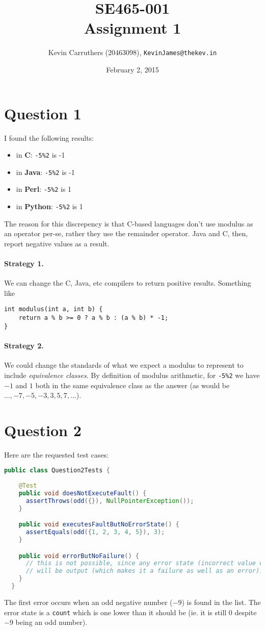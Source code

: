 \documentclass[12pt]{article}
\title{SE465-001\\Assignment 1}
\author{Kevin Carruthers (20463098), {\tt KevinJames@thekev.in}}
\date{February 2, 2015}
\begin{document}
\maketitle

\section*{Question 1}
I found the following results:
\begin{itemize}
\item in {\bf C}: \verb+-5%2+ is -1
\item in {\bf Java}: \verb+-5%2+ is -1
\item in {\bf Perl}: \verb+-5%2+ is 1
\item in {\bf Python}: \verb+-5%2+ is 1
\end{itemize}

The reason for this discrepency is that C-based languages don't use modulus as an operator per-se, rather they use the remainder operator. Java and C, then, report negative values as a result.

\paragraph{Strategy 1.}
We can change the C, Java, etc compilers to return positive results. Something like
\begin{verbatim}
int modulus(int a, int b) {
    return a % b >= 0 ? a % b : (a % b) * -1;
}
\end{verbatim}

\paragraph{Strategy 2.}
We could change the standards of what we expect a modulus to represent to include \emph{equivalence classes}. By definition of modulus arithmetic, for \verb+-5%2+ we have $-1$ and $1$ both in the same equivalence class as the answer (as would be $\dots, -7, -5, -3, 3, 5, 7, \dots$).

\section*{Question 2}

Here are the requested test cases:

\begin{lstlisting}[language=Java]
  public class Question2Tests {
    
    @Test
    public void doesNotExecuteFault() {
      assertThrows(odd({}), NullPointerException());
    }

    public void executesFaultButNoErrorState() {
      assertEquals(odd({1, 2, 3, 4, 5}), 3);
    }

    public void errorButNoFailure() {
      // this is not possible, since any error state (incorrect value of {\tt count})
      // will be output (which makes it a failure as well as an error).
    }
  }
\end{lstlisting}
The first error occurs when an odd negative number ($-9$) is found in the list. The error state is a \verb+count+ which is one lower than it should be (ie. it is still $0$ despite $-9$ being an odd number).
\end{document}
